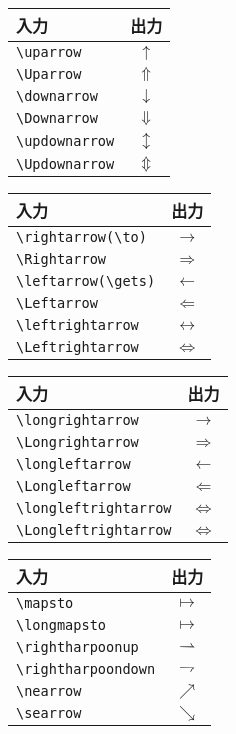 \begin{tabular}{lc}
入力 & 出力 \\ \hline
\verb|\uparrow| & $\uparrow$ \\
\verb|\Uparrow| & $\Uparrow$ \\
\verb|\downarrow| & $\downarrow$ \\
\verb|\Downarrow| & $\Downarrow$ \\
\verb|\updownarrow| & $\updownarrow$ \\
\verb|\Updownarrow| & $\Updownarrow$ \\
\end{tabular}
\begin{tabular}{lc}
入力 & 出力 \\ \hline
\verb|\rightarrow(\to)| & $\rightarrow$ \\
\verb|\Rightarrow| & $\Rightarrow$ \\
\verb|\leftarrow(\gets)| & $\leftarrow$ \\
\verb|\Leftarrow| & $\Leftarrow$ \\
\verb|\leftrightarrow| & $\leftrightarrow$ \\
\verb|\Leftrightarrow| & $\Leftrightarrow$ \\
\end{tabular}

\begin{tabular}{lc}
入力 & 出力 \\ \hline
\verb|\longrightarrow| & $\longrightarrow$ \\
\verb|\Longrightarrow| & $\Longrightarrow$ \\
\verb|\longleftarrow| & $\longleftarrow$ \\
\verb|\Longleftarrow| & $\Longleftarrow$ \\
\verb|\longleftrightarrow| & $\Longleftrightarrow$ \\
\verb|\Longleftrightarrow| & $\Longleftrightarrow$ \\
\end{tabular}
\begin{tabular}{lc}
入力 & 出力 \\ \hline
\verb|\mapsto| & $\mapsto$ \\
\verb|\longmapsto| & $\longmapsto$ \\
\verb|\rightharpoonup| & $\rightharpoonup$ \\
\verb|\rightharpoondown| & $\rightharpoondown$ \\
\verb|\nearrow| & $\nearrow$ \\
\verb|\searrow| & $\searrow$ \\
\end{tabular}



